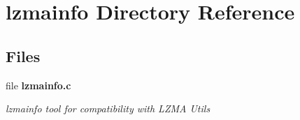\section{lzmainfo Directory Reference}
\label{dir_83dd0c573621ca152f093e9ce703e37a}
\subsection*{Files}
\begin{DoxyCompactItemize}
\item 
file \textbf{ lzmainfo.\+c}
\begin{DoxyCompactList}\small\item\em lzmainfo tool for compatibility with L\+Z\+MA Utils \end{DoxyCompactList}\end{DoxyCompactItemize}
